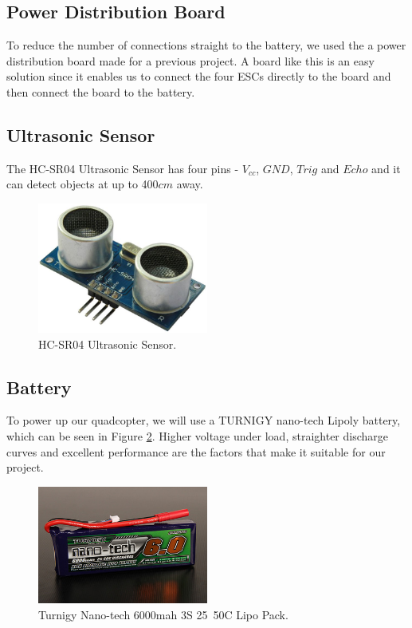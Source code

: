 \subsection{Power Distribution Board}
To reduce the number of connections straight to the battery, we used the a power distribution board made for a previous project. A board like this is an easy solution since it enables us to connect the four ESCs directly to the board and then connect the board to the battery.

\subsection{Ultrasonic Sensor}
The HC-SR04 Ultrasonic Sensor has four pins - $V_{cc}$, $GND$, $Trig$ and $Echo$ and it can detect objects at up to 400$cm$ away. 
\begin{figure}[H]
  \centering
    \includegraphics[width=0.5\textwidth]{images/HCSR04.jpg}
	\caption{HC-SR04 Ultrasonic Sensor.}
	\label{HC}
\end{figure}

\subsection{Battery}
To power up our quadcopter, we will use a TURNIGY nano-tech Lipoly battery, which can be seen in Figure \ref{battery}. Higher voltage under load, straighter discharge curves and excellent performance are the factors that make it suitable for our project. 

\begin{figure}[H]
  \centering
    \includegraphics[width=0.5\textwidth]{images/battery.jpg}
	\caption{Turnigy Nano-tech 6000mah 3S 25~50C Lipo Pack.}
	\label{battery}
\end{figure}

